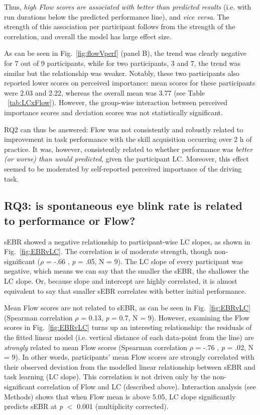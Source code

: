 \documentclass[fleqn,10pt]{wlscirep}
\begin{document}
Thus, {\it high Flow scores are associated with better than predicted results} (i.e. with run durations below the predicted performance line), and {\it vice versa}. The strength of this association per participant follows from the strength of the correlation, and overall the model has large effect size.

As can be seen in Fig.~\ref{fig:flowVperf} (panel B), the trend was clearly negative for 7 out of 9 participants, while for two participants, 3 and 7, the trend was similar but the relationship was weaker. Notably, these two participants also reported lower scores on perceived importance: mean scores for these participants were 2.03 and 2.22, whereas the overall mean was 3.77 (see Table ~\ref{tab:LCxFlow}). However, the group-wise interaction between perceived importance scores and deviation scores was not statistically significant.

RQ2 can thus be answered: Flow was not consistently and robustly related to improvement in task performance with the skill acquisition occurring over 2 h of practice. It was, however, consistently related to whether performance
was {\it better (or worse) than would predicted}, given the participant LC. Moreover, this effect seemed to be moderated by self-reported perceived importance of the driving task.

\subsection*{RQ3: is spontaneous eye blink rate is related to performance or Flow?}

sEBR showed a negative relationship to participant-wise LC slopes, as shown in Fig.~\ref{fig:EBRvLC}. The correlation is of moderate strength, though non-significant ({\it $\rho$} = -.66 , {\it p} = .05, N = 9). The LC slope of every participant was negative, which means we can say that the smaller the sEBR, the shallower the LC slope. Or, because slope and intercept are highly correlated, it is almost equivalent to say that smaller sEBR correlates with better initial performance.

Mean Flow scores are not related to sEBR, as can be seen in Fig.~\ref{fig:EBRvLC} (Spearman correlation {\it $\rho$} = 0.13, {\it p} = 0.7, N = 9). However, examining the Flow scores in Fig.~\ref{fig:EBRvLC} turns up an interesting relationship: the residuals of the fitted linear model (i.e. vertical distance of each data-point from the line) are {\it strongly} related to mean Flow scores (Spearman correlation {\it $\rho$} = -.76 , {\it p} = .02, N = 9). In other words, participants' mean Flow scores are strongly correlated with their observed deviation from the modelled linear relationship between sEBR and task learning (LC slope). This correlation is not driven only by the non-significant correlation of Flow and LC (described above). Interaction analysis (see Methods) shows that when Flow mean is above 5.05, LC slope significantly predicts sEBR at {\it p} $<$ 0.001 (multiplicity corrected).
\end{document}
